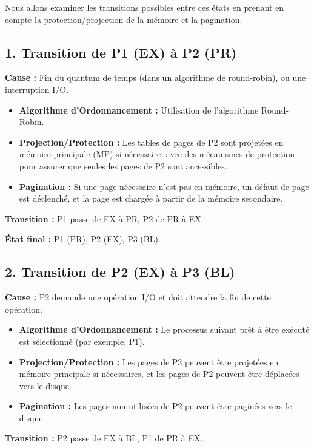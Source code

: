 Nous allons examiner les transitions possibles entre ces états en prenant en compte la protection/projection de la mémoire et la pagination.

\subsection*{1. Transition de P1 (EX) à P2 (PR)}

\textbf{Cause :} Fin du quantum de temps (dans un algorithme de round-robin), ou une interruption I/O.

\begin{itemize}
    \item \textbf{Algorithme d'Ordonnancement :} Utilisation de l'algorithme Round-Robin.
    \item \textbf{Projection/Protection :} Les tables de pages de P2 sont projetées en mémoire principale (MP) si nécessaire, avec des mécanismes de protection pour assurer que seules les pages de P2 sont accessibles.
    \item \textbf{Pagination :} Si une page nécessaire n'est pas en mémoire, un défaut de page est déclenché, et la page est chargée à partir de la mémoire secondaire.
\end{itemize}

\textbf{Transition :} P1 passe de EX à PR, P2 de PR à EX.

\textbf{État final :} P1 (PR), P2 (EX), P3 (BL).

\subsection*{2. Transition de P2 (EX) à P3 (BL)}

\textbf{Cause :} P2 demande une opération I/O et doit attendre la fin de cette opération.

\begin{itemize}
    \item \textbf{Algorithme d'Ordonnancement :} Le processus suivant prêt à être exécuté est sélectionné (par exemple, P1).
    \item \textbf{Projection/Protection :} Les pages de P3 peuvent être projetées en mémoire principale si nécessaires, et les pages de P2 peuvent être déplacées vers le disque.
    \item \textbf{Pagination :} Les pages non utilisées de P2 peuvent être paginées vers le disque.
\end{itemize}

\textbf{Transition :} P2 passe de EX à BL, P1 de PR à EX.

